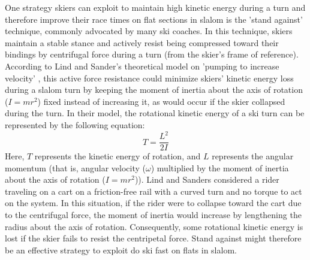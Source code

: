 One strategy skiers can exploit to maintain high kinetic energy during a turn and therefore improve their race times on flat sections in slalom is the 'stand against' technique, commonly advocated by many ski coaches. In this technique, skiers maintain a stable stance and actively resist being compressed toward their bindings by centrifugal force during a turn (from the skier's frame of reference). According to Lind and Sander's theoretical model on 'pumping to increase velocity' \cite{lind_physics_2013}, this active force resistance could minimize skiers' kinetic energy loss during a slalom turn by keeping the moment of inertia about the axis of rotation ($I = mr^2$) fixed instead of increasing it, as would occur if the skier collapsed during the turn. In their model, the rotational kinetic energy of a ski turn can be represented by the following equation: 
\[ T = \frac{L^2}{2I} \]
Here, $T$ represents the kinetic energy of rotation, and $L$ represents the angular momentum (that is, angular velocity ($\omega$) multiplied by the moment of inertia about the axis of rotation ($I = mr^2$)). Lind and Sanders considered a rider traveling on a cart on a friction-free rail with a curved turn and no torque to act on the system. In this situation, if the rider were to collapse toward the cart due to the centrifugal force, the moment of inertia would increase by lengthening the radius about the axis of rotation. Consequently, some rotational kinetic energy is lost if the skier fails to resist the centripetal force. Stand against might therefore be an effective strategy to exploit do ski fast on flats in slalom.  

